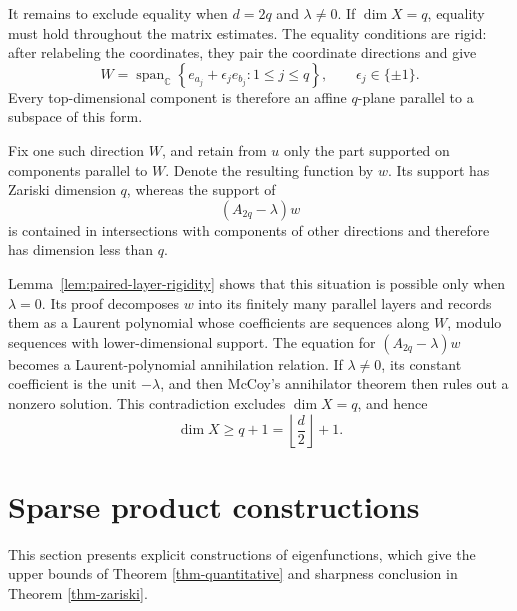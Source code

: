 \documentclass[11pt,reqno]{amsart}
\newcommand\C{\ensuremath{\mathbb{C}}}
\theoremstyle{definition}
\theoremstyle{plain}
\numberwithin{equation}{section}
\begin{document}
It remains to exclude equality when $d=2q$ and $\lambda\neq0$.
If $\dim X=q$, equality must hold throughout the matrix estimates.
The equality conditions are rigid: after relabeling the coordinates,
they pair the coordinate directions and give
\begin{equation*}
    W
    =
    \operatorname{span}_{\C}
    \left\{
        e_{a_j}+\epsilon_je_{b_j}:
        1\leq j\leq q
    \right\},
    \qquad
    \epsilon_j\in\{\pm1\}.
\end{equation*}
Every top-dimensional component is therefore an affine $q$-plane
parallel to a subspace of this form.

Fix one such direction $W$, and retain from $u$ only the part
supported on components parallel to $W$. Denote the resulting
function by $w$. Its support has Zariski dimension $q$, whereas
the support of
\begin{equation*}
    (A_{2q}-\lambda)w
\end{equation*}
is contained in intersections with components of other directions and
therefore has dimension less than $q$.

Lemma~\ref{lem:paired-layer-rigidity} shows that this situation is
possible only when $\lambda=0$. Its proof decomposes $w$ into its
finitely many parallel layers and records them as a Laurent polynomial
whose coefficients are sequences along $W$, modulo sequences with
lower-dimensional support. The equation for
$(A_{2q}-\lambda)w$ becomes a Laurent-polynomial annihilation
relation. If $\lambda\neq0$, its constant coefficient is the unit
$-\lambda$, and then McCoy's annihilator theorem then rules out a nonzero
solution. This contradiction excludes $\dim X=q$, and hence
\begin{equation*}
    \dim X
    \geq
    q+1
    =
    \left\lfloor\frac d2\right\rfloor+1.
\end{equation*}





















\section{Sparse product constructions} \label{sec:explicit-construct}
This section presents explicit constructions of eigenfunctions, which give the upper bounds of Theorem \ref{thm-quantitative} and sharpness conclusion in Theorem \ref{thm-zariski}.
\end{document}
